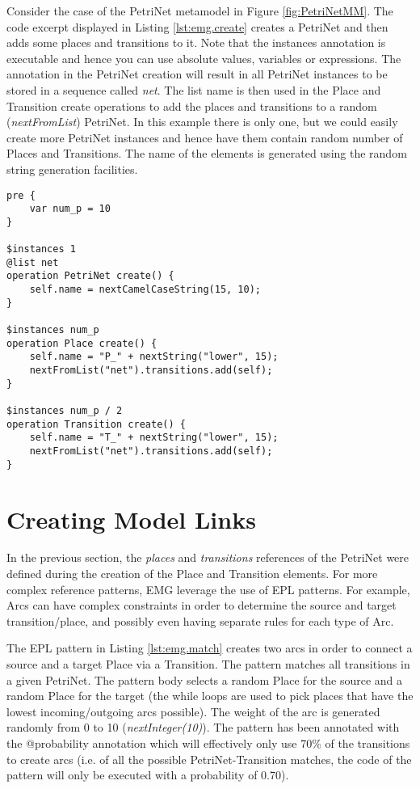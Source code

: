 Consider the case of the PetriNet metamodel in Figure \ref{fig:PetriNetMM}. The code excerpt displayed in Listing \ref{lst:emg.create} creates a PetriNet and then adds some places and transitions to it. Note that the instances annotation is executable and hence you can use absolute values, variables or expressions. The \texttt{\@list} annotation in the PetriNet creation will result in all PetriNet instances to be stored in a sequence called \emph{net}. The list name is then used in the Place and Transition create operations to add the places and transitions to a random (\emph{nextFromList}) PetriNet. In this example there is only one, but we could easily create more PetriNet instances and hence have them contain random number of Places and Transitions. The name of the elements is generated using the random string generation facilities. 

\begin{lstlisting}[float=h, caption={EMG create operations}, label=lst:emg.create, language=EOL]
pre {
    var num_p = 10
}

$instances 1
@list net
operation PetriNet create() {
    self.name = nextCamelCaseString(15, 10);
}

$instances num_p
operation Place create() {
    self.name = "P_" + nextString("lower", 15);
    nextFromList("net").transitions.add(self);
}

$instances num_p / 2
operation Transition create() {
    self.name = "T_" + nextString("lower", 15);
    nextFromList("net").transitions.add(self);
}
\end{lstlisting}

\section{Creating Model Links}\label{sec:emg.createlinks}

In the previous section, the \emph{places} and \emph{transitions} references of the PetriNet were defined during the creation of the Place and Transition elements. For more complex reference patterns, EMG leverage the use of EPL patterns. For example, Arcs can have complex constraints in order to determine the source and target transition/place, and possibly even having separate rules for each type of Arc.

The EPL pattern in Listing \ref{lst:emg.match} creates two arcs in order to connect a source and a target Place via a Transition. The pattern matches all transitions in a given PetriNet.  The pattern body selects a random Place for the source and a random Place for the target (the while loops are used to pick places that have the lowest incoming/outgoing arcs possible). The weight of the arc is generated randomly from 0 to 10 (\emph{nextInteger(10)}). The pattern has been annotated with the @probability annotation which will effectively only use 70\% of the transitions to create arcs (i.e. of all the possible PetriNet-Transition matches, the code of the pattern will only be executed with a probability of 0.70).


